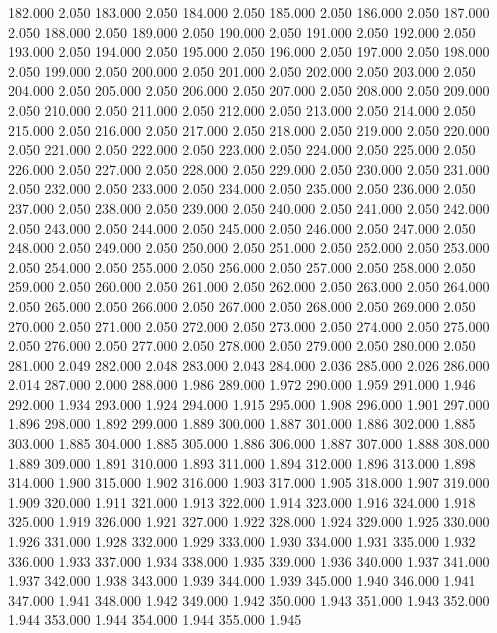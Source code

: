 182.000 2.050 
183.000 2.050 
184.000 2.050 
185.000 2.050 
186.000 2.050 
187.000 2.050 
188.000 2.050 
189.000 2.050 
190.000 2.050 
191.000 2.050 
192.000 2.050 
193.000 2.050 
194.000 2.050 
195.000 2.050 
196.000 2.050 
197.000 2.050 
198.000 2.050 
199.000 2.050 
200.000 2.050 
201.000 2.050 
202.000 2.050 
203.000 2.050 
204.000 2.050 
205.000 2.050 
206.000 2.050 
207.000 2.050 
208.000 2.050 
209.000 2.050 
210.000 2.050 
211.000 2.050 
212.000 2.050 
213.000 2.050 
214.000 2.050 
215.000 2.050 
216.000 2.050 
217.000 2.050 
218.000 2.050 
219.000 2.050 
220.000 2.050 
221.000 2.050 
222.000 2.050 
223.000 2.050 
224.000 2.050 
225.000 2.050 
226.000 2.050 
227.000 2.050 
228.000 2.050 
229.000 2.050 
230.000 2.050 
231.000 2.050 
232.000 2.050 
233.000 2.050 
234.000 2.050 
235.000 2.050 
236.000 2.050 
237.000 2.050 
238.000 2.050 
239.000 2.050 
240.000 2.050 
241.000 2.050 
242.000 2.050 
243.000 2.050 
244.000 2.050 
245.000 2.050 
246.000 2.050 
247.000 2.050 
248.000 2.050 
249.000 2.050 
250.000 2.050 
251.000 2.050 
252.000 2.050 
253.000 2.050 
254.000 2.050 
255.000 2.050 
256.000 2.050 
257.000 2.050 
258.000 2.050 
259.000 2.050 
260.000 2.050 
261.000 2.050 
262.000 2.050 
263.000 2.050 
264.000 2.050 
265.000 2.050 
266.000 2.050 
267.000 2.050 
268.000 2.050 
269.000 2.050 
270.000 2.050 
271.000 2.050 
272.000 2.050 
273.000 2.050 
274.000 2.050 
275.000 2.050 
276.000 2.050 
277.000 2.050 
278.000 2.050 
279.000 2.050 
280.000 2.050 
281.000 2.049 
282.000 2.048 
283.000 2.043 
284.000 2.036 
285.000 2.026 
286.000 2.014 
287.000 2.000 
288.000 1.986 
289.000 1.972 
290.000 1.959 
291.000 1.946 
292.000 1.934 
293.000 1.924 
294.000 1.915 
295.000 1.908 
296.000 1.901 
297.000 1.896 
298.000 1.892 
299.000 1.889 
300.000 1.887 
301.000 1.886 
302.000 1.885 
303.000 1.885 
304.000 1.885 
305.000 1.886 
306.000 1.887 
307.000 1.888 
308.000 1.889 
309.000 1.891 
310.000 1.893 
311.000 1.894 
312.000 1.896 
313.000 1.898 
314.000 1.900 
315.000 1.902 
316.000 1.903 
317.000 1.905 
318.000 1.907 
319.000 1.909 
320.000 1.911 
321.000 1.913 
322.000 1.914 
323.000 1.916 
324.000 1.918 
325.000 1.919 
326.000 1.921 
327.000 1.922 
328.000 1.924 
329.000 1.925 
330.000 1.926 
331.000 1.928 
332.000 1.929 
333.000 1.930 
334.000 1.931 
335.000 1.932 
336.000 1.933 
337.000 1.934 
338.000 1.935 
339.000 1.936 
340.000 1.937 
341.000 1.937 
342.000 1.938 
343.000 1.939 
344.000 1.939 
345.000 1.940 
346.000 1.941 
347.000 1.941 
348.000 1.942 
349.000 1.942 
350.000 1.943 
351.000 1.943 
352.000 1.944 
353.000 1.944 
354.000 1.944 
355.000 1.945 
